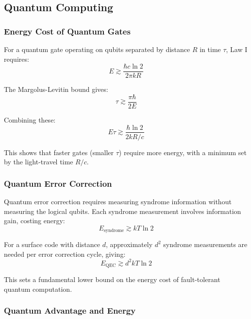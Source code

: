 \documentclass[11pt,a4paper]{article}
\theoremstyle{plain}
\theoremstyle{definition}
\theoremstyle{remark}
\begin{document}
\subsection{Quantum Computing}

\subsubsection{Energy Cost of Quantum Gates}

For a quantum gate operating on qubits separated by distance $R$ in time $\tau$, Law I requires:
\begin{equation}
E \gtrsim \frac{\hbar c\ln 2}{2\pi kR}
\end{equation}

The Margolus-Levitin bound gives:
\begin{equation}
\tau \gtrsim \frac{\pi\hbar}{2E}
\end{equation}

Combining these:
\begin{equation}
E\tau \gtrsim \frac{\hbar\ln 2}{2kR/c}
\end{equation}

This shows that faster gates (smaller $\tau$) require more energy, with a minimum set by the light-travel time $R/c$.

\subsubsection{Quantum Error Correction}

Quantum error correction requires measuring syndrome information without measuring the logical qubits. Each syndrome measurement involves information gain, costing energy:
\begin{equation}
E_{\text{syndrome}} \gtrsim kT\ln 2
\end{equation}

For a surface code with distance $d$, approximately $d^2$ syndrome measurements are needed per error correction cycle, giving:
\begin{equation}
E_{\text{QEC}} \gtrsim d^2 kT\ln 2
\end{equation}

This sets a fundamental lower bound on the energy cost of fault-tolerant quantum computation.

\subsubsection{Quantum Advantage and Energy}
\end{document}
